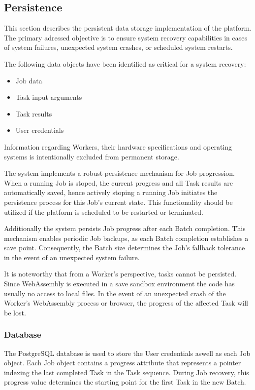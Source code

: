 \subsection{Persistence}
\label{subsec:implementation:architecture:persistence}
This section describes the persistent data storage implementation of the platform. The primary adressed objective is to ensure system recovery capabilities in cases of system failures, unexpected system crashes, or scheduled system restarts.

The following data objects have been identified as critical for a system recovery:
\begin{itemize}
    \item Job data
    \item Task input arguments
    \item Task results
    \item User credentials
\end{itemize}
Information regarding Workers, their hardware specifications and operating systems is intentionally excluded from permanent storage.

The system implements a robust persistence mechanism for Job progression. When a running Job is stoped, the current progress and all Task results are automatically saved, hence actively stoping a running Job initiates the persistence process for this Job's current state. This functionality should be utilized if the platform is scheduled to be restarted or terminated.

Additionally the system persists Job progress after each Batch completion. This mechanism enables periodic Job backups, as each Batch completion establishes a save point. Consequently, the Batch size determines the Job's fallback tolerance in the event of an unexpected system failure.

It is noteworthy that from a Worker's perspective, tasks cannot be persisted. Since WebAssembly is executed in a save sandbox environment the code has usually no access to local files. In the event of an unexpected crash of the Worker's WebAssembly process or browser, the progress of the affected Task will be lost.

\subsubsection{Database}
The PostgreSQL database is used to store the User credentials aswell as each Job object. Each Job object contains a progress attribute that represents a pointer indexing the last completed Task in the Task sequence. During Job recovery, this progress value determines the starting point for the first Task in the new Batch.

